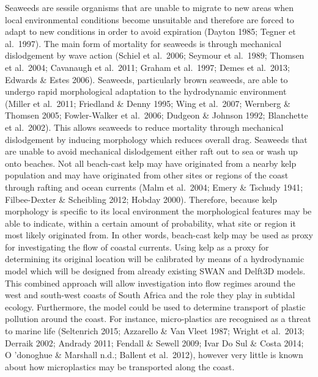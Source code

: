 \documentclass[
]{article}
\begin{document}
Seaweeds are sessile organisms that are unable to migrate to new areas
when local environmental conditions become unsuitable and therefore are
forced to adapt to new conditions in order to avoid expiration (Dayton
1985; Tegner et al.~1997). The main form of mortality for seaweeds is
through mechanical dislodgement by wave action (Schiel et al.~2006;
Seymour et al.~1989; Thomsen et al.~2004; Cavanaugh et al.~2011; Graham
et al.~1997; Demes et al.~2013; Edwards \& Estes 2006). Seaweeds,
particularly brown seaweeds, are able to undergo rapid morphological
adaptation to the hydrodynamic environment (Miller et al.~2011;
Friedland \& Denny 1995; Wing et al.~2007; Wernberg \& Thomsen 2005;
Fowler-Walker et al.~2006; Dudgeon \& Johnson 1992; Blanchette et
al.~2002). This allows seaweeds to reduce mortality through mechanical
dislodgement by inducing morphology which reduces overall drag. Seaweeds
that are unable to avoid mechanical dislodgement either raft out to sea
or wash up onto beaches. Not all beach-cast kelp may have originated
from a nearby kelp population and may have originated from other sites
or regions of the coast through rafting and ocean currents (Malm et
al.~2004; Emery \& Tschudy 1941; Filbee-Dexter \& Scheibling 2012;
Hobday 2000). Therefore, because kelp morphology is specific to its
local environment the morphological features may be able to indicate,
within a certain amount of probability, what site or region it most
likely originated from. In other words, beach-cast kelp may be used as
proxy for investigating the flow of coastal currents. Using kelp as a
proxy for determining its original location will be calibrated by means
of a hydrodynamic model which will be designed from already existing
SWAN and Delft3D models. This combined approach will allow investigation
into flow regimes around the west and south-west coasts of South Africa
and the role they play in subtidal ecology. Furthermore, the model could
be used to determine transport of plastic pollution around the coast.
For instance, micro-plastics are recognised as a threat to marine life
(Seltenrich 2015; Azzarello \& Van Vleet 1987; Wright et al.~2013;
Derraik 2002; Andrady 2011; Fendall \& Sewell 2009; Ivar Do Sul \& Costa
2014; O 'donoghue \& Marshall n.d.; Ballent et al.~2012), however very
little is known about how microplastics may be transported along the
coast.
\end{document}
